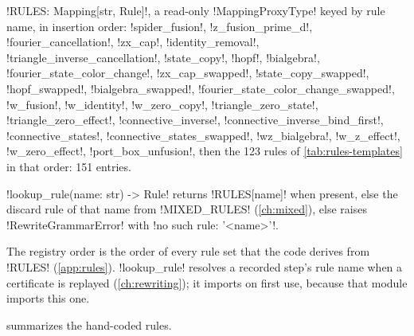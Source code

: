 \begin{signature}
\py!RULES: Mapping[str, Rule]!, a read-only \py!MappingProxyType! keyed by rule name, in insertion order: \azx!spider_fusion!, \azx!z_fusion_prime_d!, \azx!fourier_cancellation!, \azx!zx_cap!, \azx!identity_removal!, \azx!triangle_inverse_cancellation!, \azx!state_copy!, \azx!hopf!, \azx!bialgebra!, \azx!fourier_state_color_change!, \azx!zx_cap_swapped!, \azx!state_copy_swapped!, \azx!hopf_swapped!, \azx!bialgebra_swapped!, \azx!fourier_state_color_change_swapped!, \azx!w_fusion!, \azx!w_identity!, \azx!w_zero_copy!, \azx!triangle_zero_state!, \azx!triangle_zero_effect!, \azx!connective_inverse!, \azx!connective_inverse_bind_first!, \azx!connective_states!, \azx!connective_states_swapped!, \azx!wz_bialgebra!, \azx!w_z_effect!, \azx!w_zero_effect!, \azx!port_box_unfusion!, then the 123 rules of \cref{tab:rules-templates} in that order: 151 entries.

\py!lookup_rule(name: str) -> Rule! returns \py!RULES[name]! when present, else the discard rule of that name from \py!MIXED_RULES! (\cref{ch:mixed}), else raises \py!RewriteGrammarError! with \code!no such rule: '<name>'!.
\end{signature}

The registry order is the order of every rule set that the code derives from \py!RULES! (\cref{app:rules}). \py!lookup_rule! resolves a recorded step's rule name when a certificate is replayed (\cref{ch:rewriting}); it imports  on first use, because that module imports this one.

 summarizes the hand-coded rules.

